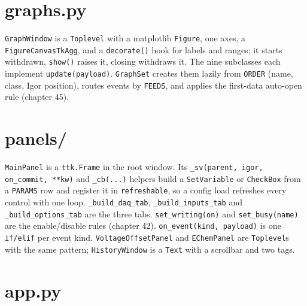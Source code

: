 \section{graphs.py}

\texttt{Graph\discretionary{}{}{}Window} is a \texttt{Toplevel} with a matplotlib \texttt{Figure}, one axes, a \texttt{Figure\discretionary{}{}{}Canvas\discretionary{}{}{}Tk\discretionary{}{}{}Agg}, and a \texttt{decorate()} hook for labels and ranges; it starts withdrawn, \texttt{show()} raises it, closing withdraws it. The nine subclasses each implement \texttt{update(payload)}. \texttt{Graph\discretionary{}{}{}Set} creates them lazily from \texttt{ORDER} (name, class, Igor position), routes events by \texttt{FEEDS}, and applies the first-data auto-open rule (chapter 45).

\section{panels/}

\texttt{Main\discretionary{}{}{}Panel} is a \texttt{ttk.\discretionary{}{}{}Frame} in the root window. Its \texttt{\_\discretionary{}{}{}sv(parent,\discretionary{}{}{} igor,\discretionary{}{}{} on\_\discretionary{}{}{}commit,\discretionary{}{}{} **kw)} and \texttt{\_\discretionary{}{}{}cb(.\discretionary{}{}{}.\discretionary{}{}{}.\discretionary{}{}{})} helpers build a \texttt{Set\discretionary{}{}{}Variable} or \texttt{Check\discretionary{}{}{}Box} from a \texttt{PARAMS} row and register it in \texttt{refreshable}, so a config load refreshes every control with one loop. \texttt{\_\discretionary{}{}{}build\_\discretionary{}{}{}daq\_\discretionary{}{}{}tab}, \texttt{\_\discretionary{}{}{}build\_\discretionary{}{}{}inputs\_\discretionary{}{}{}tab} and \texttt{\_\discretionary{}{}{}build\_\discretionary{}{}{}options\_\discretionary{}{}{}tab} are the three tabs. \texttt{set\_\discretionary{}{}{}writing(on)} and \texttt{set\_\discretionary{}{}{}busy(name)} are the enable/disable rules (chapter 42). \texttt{on\_\discretionary{}{}{}event(kind,\discretionary{}{}{} payload)} is one \texttt{if/\discretionary{}{}{}elif} per event kind. \texttt{Voltage\discretionary{}{}{}Offset\discretionary{}{}{}Panel} and \texttt{EChem\discretionary{}{}{}Panel} are \texttt{Toplevel}s with the same pattern; \texttt{History\discretionary{}{}{}Window} is a \texttt{Text} with a scrollbar and two tags.

\section{app.py}

